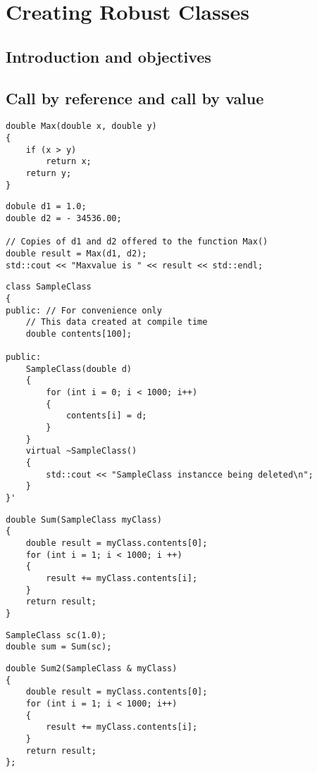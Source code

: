 \chapter{Creating Robust Classes}

\section{Introduction and objectives}

\section{Call by reference and call by value}

\begin{lstlisting}
double Max(double x, double y)
{
	if (x > y)
		return x;
	return y;
}
\end{lstlisting}

\begin{lstlisting}
dobule d1 = 1.0;
double d2 = - 34536.00;

// Copies of d1 and d2 offered to the function Max()
double result = Max(d1, d2);
std::cout << "Maxvalue is " << result << std::endl;
\end{lstlisting}

\begin{lstlisting}
class SampleClass
{
public:	// For convenience only
	// This data created at compile time
	double contents[100];

public:
	SampleClass(double d)
	{
		for (int i = 0; i < 1000; i++)
		{
			contents[i] = d;
		}
	}
	virtual ~SampleClass()
	{
		std::cout << "SampleClass instancce being deleted\n";
	}
}'
\end{lstlisting}

\begin{lstlisting}
double Sum(SampleClass myClass)
{
	double result = myClass.contents[0];
	for (int i = 1; i < 1000; i ++)
	{
		result += myClass.contents[i];
	}
	return result;
}
\end{lstlisting}

\begin{lstlisting}
SampleClass sc(1.0);
double sum = Sum(sc);
\end{lstlisting}

\begin{lstlisting}
double Sum2(SampleClass & myClass)
{
	double result = myClass.contents[0];
	for (int i = 1; i < 1000; i++)
	{
		result += myClass.contents[i];
	}
	return result;
};
\end{lstlisting}

